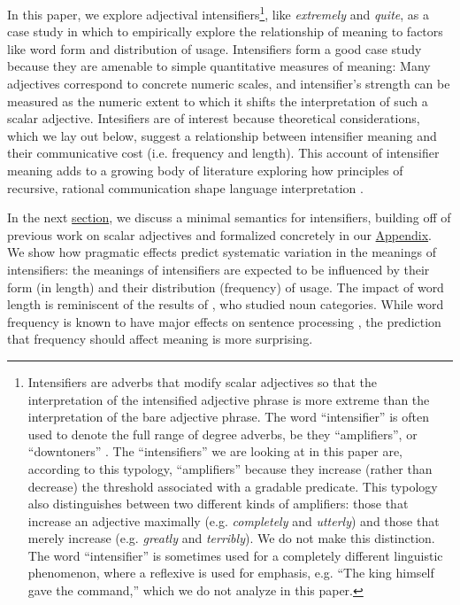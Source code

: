 \documentclass[10pt,letterpaper]{article}
\newcommand{\w}[1]{\emph{#1}}
\begin{document}
In this paper, we explore adjectival intensifiers\footnote{
Intensifiers are adverbs that modify scalar adjectives so that the interpretation of the intensified adjective phrase is more extreme than the interpretation of the bare adjective phrase.
The word ``intensifier'' is often used to denote the full range of degree adverbs, be they ``amplifiers'', or ``downtoners'' \cite{quirk_comprehensive_1985}.
The ``intensifiers'' we are looking at in this paper are, according to this typology, ``amplifiers'' because they increase (rather than decrease) the threshold associated with a gradable predicate.
This typology also distinguishes between two different kinds of amplifiers: those that increase an adjective maximally (e.g. \w{completely} and \w{utterly}) and those that merely increase (e.g. \w{greatly} and \w{terribly}).
We do not make this distinction.
The word ``intensifier'' is sometimes used for a completely different linguistic phenomenon, where a reflexive is used for emphasis, e.g. ``The king himself gave the command,'' which we do not analyze in this paper. 
},
like \w{extremely} and \w{quite}, as a case study in which to empirically explore the relationship of meaning to factors like word form and distribution of usage.
Intensifiers form a good case study because they are amenable to simple quantitative measures of meaning: Many adjectives correspond to concrete numeric scales, and intensifier's strength can be measured as the numeric extent to which it shifts the interpretation of such a scalar adjective. Intesifiers are of interest because theoretical considerations, which we lay out below, suggest a relationship between intensifier meaning and their communicative cost (i.e. frequency and length).
This account of intensifier meaning adds to a growing body of literature exploring how principles of recursive, rational communication shape language interpretation \cite[e.g.]{grice_logic_1975, frank_predicting_2012, goodman_knowledge_2013, franke_quantity_2011, russell_probabilistic_2012, kao_nonliteral_2014, bergen_pragmatic_2014}.

In the next \hyperref[sec:semantics]{section}, we discuss a minimal semantics for intensifiers, building off of previous work on scalar adjectives and formalized concretely in our \hyperref[app:model]{Appendix}.
We show how pragmatic effects predict systematic variation in the meanings of intensifiers: the meanings of intensifiers are expected to be influenced by their form (in length) and their distribution (frequency) of usage.
The impact of word length is reminiscent of the results of , who studied noun categories.
While word frequency is known to have major effects on sentence processing \cite[e.g.]{levy_expectation-based_2008}, the prediction that frequency should affect meaning is more surprising.
\end{document}
